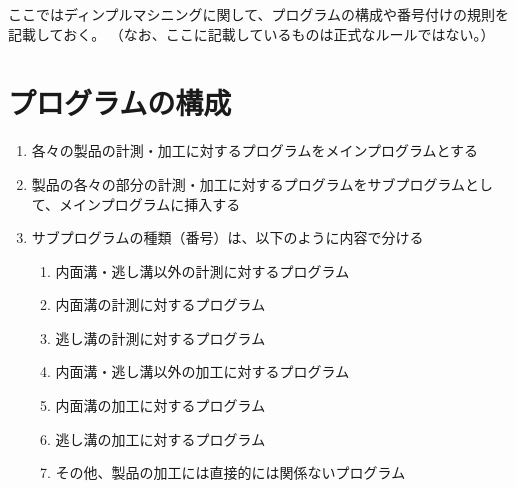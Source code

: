 
ここではディンプルマシニングに関して、プログラムの構成や番号付けの規則を記載しておく。
（なお、ここに記載しているものは正式なルールではない。）


\section{プログラムの構成}
\begin{enumerate}
\item 各々の製品の計測・加工に対するプログラムをメインプログラムとする
\item 製品の各々の部分の計測・加工に対するプログラムをサブプログラムとして、メインプログラムに挿入する
\item サブプログラムの種類（番号）は、以下のように内容で分ける
  \begin{enumerate}
  \item 内面溝・逃し溝以外の計測に対するプログラム
  \item 内面溝の計測に対するプログラム
  \item 逃し溝の計測に対するプログラム
  \item 内面溝・逃し溝以外の加工に対するプログラム
  \item 内面溝の加工に対するプログラム
  \item 逃し溝の加工に対するプログラム
  \item その他、製品の加工には直接的には関係ないプログラム
  \end{enumerate}
\end{enumerate}



